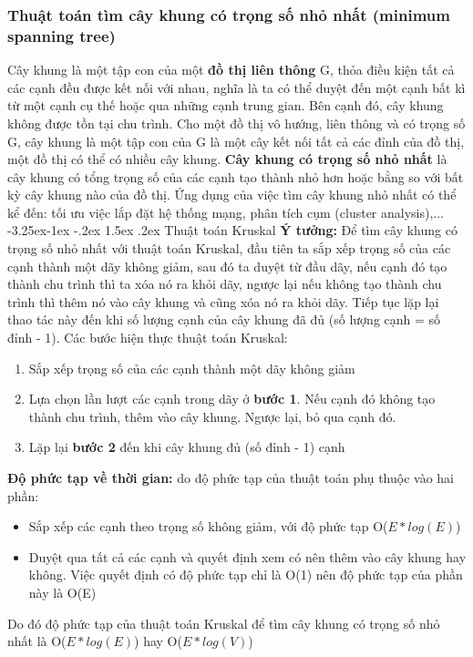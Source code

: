 \documentclass[a4paper]{article}
\makeatletter
\newcounter {subsubsubsection}[subsubsection]
\newcommand\subsubsubsection{\@startsection{subsubsubsection}{4}{\z@}%
                                     {-3.25ex\@plus -1ex \@minus -.2ex}%
                                     {1.5ex \@plus .2ex}%
                                     {\normalfont\normalsize\bfseries}}
\makeatother
\begin{document}
        \subsubsection{Thuật toán tìm cây khung có trọng số nhỏ nhất (minimum spanning tree)}
Cây khung là một tập con của một \textbf{đồ thị liên thông} G, thỏa điều kiện tất cả các cạnh đều được kết nối với nhau, nghĩa là ta có thể duyệt đến một cạnh bất kì từ một cạnh cụ thế hoặc qua những cạnh trung gian. Bên cạnh đó, cây khung không được tồn tại chu trình.
Cho một đồ thị vô hướng, liên thông và có trọng số G, cây khung là một tập con của G là một cây kết nối tất cả các đỉnh của đồ thị, một đồ thị có thể có nhiều cây khung. \textbf{Cây khung có trọng số nhỏ nhất} là cây khung có tổng trọng số của các cạnh tạo thành nhỏ hơn hoặc bằng so với bất kỳ cây khung nào của đồ thị.
Ứng dụng của việc tìm cây khung nhỏ nhất có thể kể đến: tối ưu việc lắp đặt hệ thống mạng, phân tích cụm (cluster analysis),...
            \subsubsubsection{Thuật toán Kruskal}
\textbf{Ý tưởng:} Để tìm cây khung có trọng số nhỏ nhất với thuật toán Kruskal, đầu tiên ta sắp xếp trọng số của các cạnh thành một dãy không giảm, sau đó ta duyệt từ đầu dãy, nếu cạnh đó tạo thành chu trình thì ta xóa nó ra khỏi dãy, ngược lại nếu không tạo thành chu trình thì thêm nó vào cây khung và cũng xóa nó ra khỏi dãy. Tiếp tục lặp lại thao tác này đến khi số lượng cạnh của cây khung đã đủ (số lượng cạnh = số đỉnh - 1).
Các bước hiện thực thuật toán Kruskal:
\begin{enumerate}
    \item Sắp xếp trọng số của các cạnh thành một dãy không giảm
    \item Lựa chọn lần lượt các cạnh trong dãy ở \textbf{bước 1}. Nếu cạnh đó không tạo thành chu trình, thêm vào cây khung. Ngược lại, bỏ qua cạnh đó.
    \item Lặp lại \textbf{bước 2} đến khi cây khung đủ (số đỉnh - 1) cạnh
\end{enumerate}
\textbf{Độ phức tạp về thời gian:} do độ phức tạp của thuật toán phụ thuộc vào hai phần: 
\begin{itemize}
    \item Sắp xếp các cạnh theo trọng số không giảm, với độ phức tạp O($E*log(E)$)
    \item Duyệt qua tất cả các cạnh và quyết định xem có nên thêm vào cây khung hay không. Việc quyết định có độ phức tạp chỉ là O(1) nên độ phức tạp của phần này là O(E)
\end{itemize}
Do đó độ phức tạp của thuật toán Kruskal để tìm cây khung có trọng số nhỏ nhất là O($E*log(E)$) hay O($E*log(V)$) \\
\end{document}
